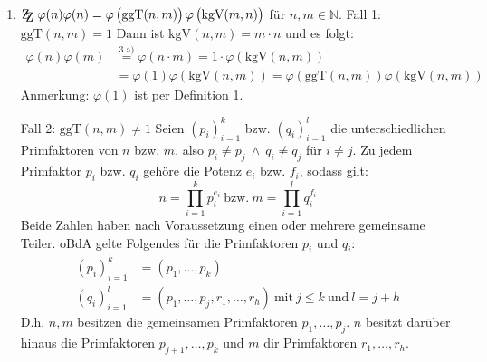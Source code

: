 \documentclass[DIN, pagenumber=false, fontsize=11pt, parskip=half]{scrartcl}
\newcommand{\N}[0]{\mathbb{N}}
\newcommand{\ZZ}{\mathrm{Z\kern-.3em\raise-0.5ex\hbox{Z}}}
\newcommand{\ggt}{\text{ggT}}
\newcommand{\kgv}{\text{kgV}}
\begin{document}
\begin{enumerate}[label=\alph*)]
        \newpage

        \item $\ZZ \ \varphi(n) \varphi(n) = \varphi\left(\ggt(n, m)\right) \varphi\left(\kgv(m, n)\right)$ für $n, m \in \N$. \newline
        Fall 1: $\ggt(n, m) = 1$ \newline
        Dann ist $\kgv(n, m) = m \cdot n$ und es folgt:
        \begin{align*}
            \varphi(n) \varphi(m) &\stackrel{\text{3 a)}}{=} \varphi(n \cdot m) = 1 \cdot \varphi\left(\kgv(n, m)\right) \\
            &= \varphi(1) \varphi\left(\kgv(n, m)\right) = \varphi(\ggt(n, m)) \varphi\left(\kgv(n, m)\right)
        \end{align*}
        Anmerkung: $\varphi(1)$ ist per Definition 1.


        Fall 2: $\ggt(n, m) \neq 1$ \newline
        Seien $(p_i)_{i=1}^k$ bzw. $(q_i)_{i=1}^l$ die unterschiedlichen Primfaktoren von $n$ bzw. $m$, also $p_i \neq p_j \ \wedge \ q_i \neq q_j$ für 
        $i \neq j$. Zu jedem Primfaktor $p_i$ bzw. $q_i$ gehöre die Potenz $e_i$ bzw. $f_i$, sodass gilt:
        \begin{equation}
            n = \prod_{i=1}^k{p_i^{e_i}} \ \text{bzw.} \ m = \prod_{i=1}^l{q_i^{f_i}} \label{eq:pfz}
        \end{equation}
        Beide Zahlen haben nach Voraussetzung einen oder mehrere gemeinsame Teiler. oBdA gelte Folgendes für die Primfaktoren $p_i$ und $q_i$:
        \begin{align}
            (p_i)_{i=1}^k &= (p_1, \dots, p_k) \label{eq:nPrime}\\
            (q_i)_{i=1}^l &= (p_1, \dots, p_j, r_1, \dots, r_h) \ \text{mit} \ j \leq k \ \text{und} \ l = j+h \label{eq:mPrime}
        \end{align}
        D.h. $n, m$ besitzen die gemeinsamen Primfaktoren $p_1, \dots, p_j$. $n$ besitzt darüber hinaus die Primfaktoren $ p_{j+1}, \dots, p_k$ und $m$
        dir Primfaktoren $r_1, \dots, r_h$.


\end{enumerate}
\end{document}
